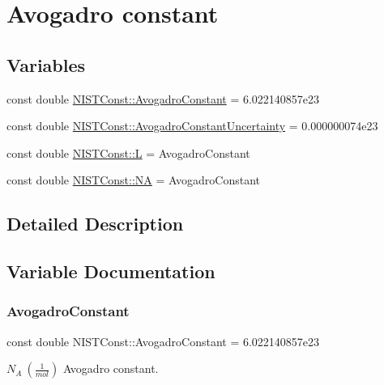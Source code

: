 \hypertarget{group___avogadro_constant}{}\section{Avogadro constant}
\label{group___avogadro_constant}
\subsection*{Variables}
\begin{DoxyCompactItemize}
\item 
const double \hyperlink{group___avogadro_constant_gad82b2a4777628c4e67a87b8f5b99174e}{N\+I\+S\+T\+Const\+::\+Avogadro\+Constant} = 6.\+022140857e23
\item 
const double \hyperlink{group___avogadro_constant_ga38f3e71e31d844bbfe2dfacf7100c4d1}{N\+I\+S\+T\+Const\+::\+Avogadro\+Constant\+Uncertainty} = 0.\+000000074e23
\item 
const double \hyperlink{group___avogadro_constant_ga0d410e47da7c9d6841958899d80e4b75}{N\+I\+S\+T\+Const\+::L} = Avogadro\+Constant
\item 
const double \hyperlink{group___avogadro_constant_gad08af58ac1b1ee41e25bd8564a74bc42}{N\+I\+S\+T\+Const\+::\+NA} = Avogadro\+Constant
\end{DoxyCompactItemize}


\subsection{Detailed Description}


\subsection{Variable Documentation}
\mbox{\label{group___avogadro_constant_gad82b2a4777628c4e67a87b8f5b99174e}} 
\subsubsection{\texorpdfstring{Avogadro\+Constant}{AvogadroConstant}}
{\footnotesize\ttfamily const double N\+I\+S\+T\+Const\+::\+Avogadro\+Constant = 6.\+022140857e23}

$N_A \ (\frac{1}{mol})$ Avogadro constant. \mbox{\label{group___avogadro_constant_ga38f3e71e31d844bbfe2dfacf7100c4d1}} 
